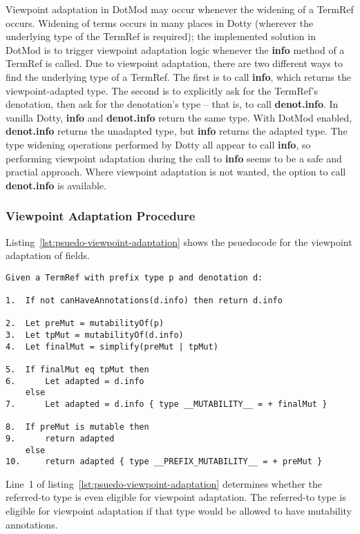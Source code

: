 \documentclass[11pt]{report}
\newcommand{\cdf}{\bf\ttfamily} %
\newcommand{\cde}{\cdf\footnotesize}  %
\newcommand{\cd}{\cdf\small}  %
\begin{document}
Viewpoint adaptation in DotMod may occur whenever the widening of a TermRef occurs. Widening of terms occurs in many places in Dotty (wherever the underlying type of the TermRef is required); the implemented solution in DotMod is to trigger viewpoint adaptation logic whenever the {\cd info} method of a TermRef is called. Due to viewpoint adaptation, there are two different ways to find the underlying type of a TermRef. The first is to call {\cd info}, which returns the viewpoint-adapted type. The second is to explicitly ask for the TermRef's denotation, then ask for the denotation's type -- that is, to call {\cd denot.info}. In vanilla Dotty, {\cd info} and {\cd denot.info} return the same type. With DotMod enabled, {\cd denot.info} returns the unadapted type, but {\cd info} returns the adapted type. The type widening operations performed by Dotty all appear to call {\cd info}, so performing viewpoint adaptation during the call to {\cd info} seems to be a safe and practial approach. Where viewpoint adaptation is not wanted, the option to call {\cd denot.info} is available.

\subsubsection{Viewpoint Adaptation Procedure}

Listing~\ref{lst:psuedo-viewpoint-adaptation} shows the psuedocode for the viewpoint adaptation of fields.

\begin{lstlisting}[float=htbp, caption={Psuedocode for Viewpoint Adaptation of Fields}, language={PsuedoCode}, emphstyle={\cde\color{Black}}, label={lst:psuedo-viewpoint-adaptation}]
Given a TermRef with prefix type p and denotation d:

1.  If not canHaveAnnotations(d.info) then return d.info

2.  Let preMut = mutabilityOf(p)
3.  Let tpMut = mutabilityOf(d.info)
4.  Let finalMut = simplify(preMut | tpMut)

5.  If finalMut eq tpMut then
6.      Let adapted = d.info
    else
7.      Let adapted = d.info { type __MUTABILITY__ = + finalMut }

8.  If preMut is mutable then
9.      return adapted
    else
10.     return adapted { type __PREFIX_MUTABILITY__ = + preMut }
\end{lstlisting}

Line~1 of listing~\ref{lst:psuedo-viewpoint-adaptation} determines whether the referred-to type is even eligible for viewpoint adaptation.
The referred-to type is eligible for viewpoint adaptation if that type would be allowed to have mutability annotations.
\end{document}
